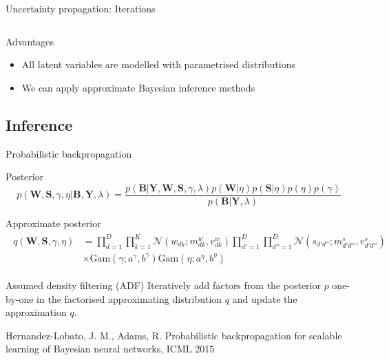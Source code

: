 \documentclass[9pt]{beamer}
\begin{document}
\begin{frame}{Uncertainty propagation: Iterations}
\begin{columns}
\begin{column}{0.67\textwidth}
      \end{column}
    \end{columns}
  \begin{block}{Advantages}
    \begin{itemize}
      \item[] {\color{blue}All latent variables are modelled with parametrised distributions}
      \item[] {\color{blue}We can apply approximate Bayesian inference methods}
    \end{itemize}
  \end{block}
\end{frame}

\subsection[Inference]{Inference}
\begin{frame}{Probabilistic backpropagation}
\begin{block}{Posterior}
 \begin{equation*}
  p(\mathbf{W}, \mathbf{S}, \gamma, \eta | \mathbf{B}, \mathbf{Y}, \lambda)
  = \frac{p(\mathbf{B} | \mathbf{Y}, \mathbf{W},  \mathbf{S}, \gamma, \lambda) p(\mathbf{W} | \eta )p(\mathbf{S} | \eta) p(\eta) p(\gamma)}{p(\mathbf{B} | \mathbf{Y}, \lambda)}
  \end{equation*}
  \end{block}

\begin{block}{Approximate posterior}
\begin{align*}
\begin{split}
q(\mathbf{W}, \mathbf{S}, \gamma, \eta) &= \prod_{d=1}^D\prod_{k=1}^K \mathcal{N}(w_{dk} ; m^w_{dk}, v^w_{dk}) \prod_{d'=1}^D\prod_{d''=1}^D \mathcal{N}(s_{d'd''} ; m^s_{d'd''}, v^s_{d'd''}) \\
&\times \text{Gam}(\gamma; a^\gamma, b^\gamma) \text{Gam}(\eta; a^\eta, b^\eta)
\end{split}
\end{align*}
  \end{block}

\begin{block}{Assumed density filtering (ADF)}
Iteratively add factors from the posterior $p$ one-by-one in the factorised approximating distribution $q$ and update the approximation $q$. 
\end{block}

\footnotesize{Hernandez-Lobato, J. M., Adams, R. Probabilistic backpropagation for scalable learning of Bayesian neural networks, ICML 2015}
\end{frame}
\end{document}
